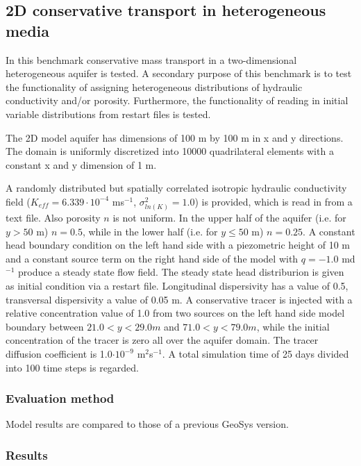 \subsection{2D conservative transport in heterogeneous media}
\label{l_s_benchmark_2d_het}

In this benchmark conservative mass transport in a two-dimensional heterogeneous aquifer is tested. A secondary purpose of this benchmark is to test the functionality of assigning heterogeneous distributions of hydraulic conductivity and/or porosity. Furthermore, the functionality of reading in initial variable distributions from restart files is tested.

The 2D model aquifer has dimensions of 100 m by 100 m in x and y directions. The domain is uniformly discretized into 10000 quadrilateral elements with a constant x and y dimension of 1 m.

A randomly distributed but spatially correlated isotropic hydraulic conductivity field ($K_{eff} = 6.339\cdot10^{-4}$ ms$^{-1}$, $\sigma^2_{ln(K)}=1.0$) is provided, which is read in from a text file. Also porosity $n$ is not uniform. In the upper half of the aquifer (i.e. for $y > 50$ m) $n=0.5$, while in the lower half (i.e. for $y \leq 50$ m) $n=0.25$. A constant head boundary condition on the left hand side with a piezometric height of 10 m and a constant source term on the right hand side of the model with $q = -1.0$ md$^{-1}$ produce a steady state flow field. The steady state head distriburion is given as initial condition via a restart file. Longitudinal dispersivity has a value of 0.5, transversal dispersivity a value of 0.05 m. A conservative tracer is injected with a relative concentration value of 1.0 from two sources on the left hand side model boundary between $21.0 < y < 29.0 m$ and $71.0 < y < 79.0 m$, while the initial concentration of the tracer is zero all over the aquifer domain. The tracer diffusion coefficient is 1.0$\cdot10^{-9}$ m$^2$s$^{-1}$. A total simulation time of 25 days divided into 100 time steps is regarded.

\subsubsection*{Evaluation method}

Model results are compared to those of a previous GeoSys version.

\subsubsection*{Results}

